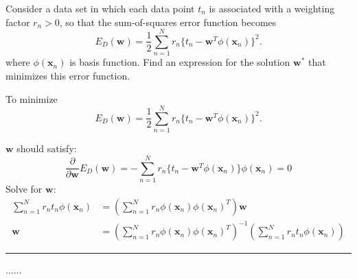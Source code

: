 \documentclass[twoside]{article}
\newenvironment{problem}[2][Problem]{\begin{trivlist}
		\item[\hskip \labelsep {\bfseries #1}\hskip \labelsep {\bfseries #2.}]}{\end{trivlist}}
\newenvironment{solution}{{\bf Solution:}}{\hfill\rule{2mm}{2mm}}
\begin{document}
\begin{problem}{3}
	Consider a data set in which each data point $t_n$ is associated with a weighting factor $r_n > 0$, so that the sum-of-squares error function becomes $$E_D(\mathbf{w}) = \frac{1}{2} \sum_{n=1}^N r_n \{t_n - \mathbf{w}^T\phi(\mathbf{x}_n)\}^2.$$ where $\phi(\mathbf{x}_n)$ is basis function.  Find an expression for the solution $\mathbf{w}^*$ that minimizes this error function. 
\end{problem}
\begin{solution}
	To minimize $$E_D(\mathbf{w}) = \frac{1}{2} \sum_{n=1}^N r_n \{t_n - \mathbf{w}^T\phi(\mathbf{x}_n)\}^2.$$
	
	$\mathbf{w}$ should satisfy:
	$$
	\frac{\partial}{\partial \mathbf{w}} E_D(\mathbf{w}) = - \sum_{n=1}^N r_n \{t_n - \mathbf{w}^T\phi(\mathbf{x}_n)\}\phi(\mathbf{x}_n) = 0
	$$
	Solve for $\mathbf{w}$:
	\begin{align*}
	\sum_{n=1}^N r_n t_n \phi(\mathbf{x}_n) &= (\sum_{n=1}^N r_n \phi(\mathbf{x}_n) \phi(\mathbf{x}_n)^T)\mathbf{w} \\
				\mathbf{w} &= (\sum_{n=1}^N r_n \phi(\mathbf{x}_n) \phi(\mathbf{x}_n)^T)^{-1} (\sum_{n=1}^N r_n t_n \phi(\mathbf{x}_n))
	\end{align*}

\end{solution}

\begin{problem}{4}
	......
\end{problem}
\end{document}
